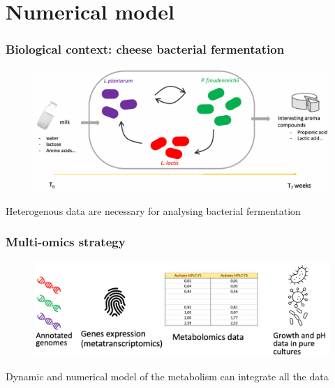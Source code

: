 \documentclass[8pt]{beamer}
\begin{document}
\section{Numerical model}
\begin{frame}
\frametitle{Biological context: cheese bacterial fermentation}
\begin{adjustwidth}{-0.8cm}{}
\begin{figure}
\includegraphics[width=1.15\textwidth]{figures/context-cheese}
\end{figure}
\end{adjustwidth}
\begin{block}{}
Heterogenous data are necessary for analysing bacterial fermentation
\end{block}
\end{frame}

\begin{frame}
\frametitle{Multi-omics strategy}
\begin{adjustwidth}{-0.8cm}{}
\begin{figure}
\includegraphics[width=1.15\textwidth]{figures/multi-omics}
\end{figure}
\end{adjustwidth}
\begin{block}{}
Dynamic and numerical model of the metabolism can integrate all the data
\end{block}
\end{frame}
\end{document}
